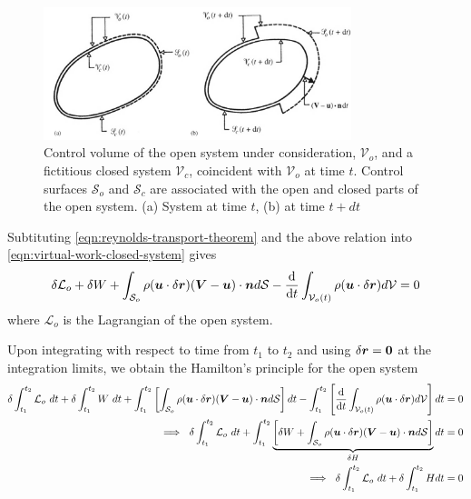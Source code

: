\documentclass[12pt]{report}
\begin{document}
\begin{figure}[h!]
	\centering
	\includegraphics[width=0.8\textwidth]{open-and-closed-portions}
	\caption{Control volume of the open system under consideration, $\mathcal{V}_o$, and a fictitious closed system $\mathcal{V}_c$, coincident with $\mathcal{V}_o$ at time $t$. Control surfaces $\mathcal{S}_o$ and $\mathcal{S}_c$ are associated with the open and closed parts of the open system. (a) System at time $t$, (b) at time $t + dt$}
	\label{fig:open-and-closed-portions}
\end{figure}

Subtituting \ref{eqn:reynolds-transport-theorem} and the above relation into \ref{eqn:virtual-work-closed-system} gives
\begin{align*}
 \delta \mathcal{L}_o + \delta W + \int_{\mathcal{S}_o} \rho (\vb*{u}\cdot \delta \vb*{r}) (\vb*{V} - \vb*{u}) \cdot \vb*{n} d\mathcal{S} -
 \dv{}{t} \int_{\mathcal{V}_o (t)} \rho (\vb*{u}\cdot \delta \vb*{r})d\mathcal{V} = 0
\end{align*}
where $\mathcal{L}_o$ is the Lagrangian of the open system.


Upon integrating with respect to time from $t_1$ to $t_2$ and using $\delta \vb*{r} = \vb*{0}$ at the integration limits, we obtain the Hamilton's principle for the open system
\begin{align}
  \delta \int_{t_1}^{t_2}\mathcal{L}_o~dt + \delta \int_{t_1}^{t_2} W~dt + \int_{t_1}^{t_2}\left[\int_{\mathcal{S}_o} \rho (\vb*{u}\cdot \delta \vb*{r}) (\vb*{V} - \vb*{u}) \cdot \vb*{n} d\mathcal{S}\right] dt - \int_{t_1}^{t_2} \left[
 \dv{}{t} \int_{\mathcal{V}_o (t)} \rho (\vb*{u}\cdot \delta \vb*{r})d\mathcal{V}\right] dt &= 0 \notag \\
 \implies~\delta \int_{t_1}^{t_2}\mathcal{L}_o~dt + \int_{t_1}^{t_2} \underbrace{\left[\delta W + \int_{\mathcal{S}_o}\rho (\vb*{u}\cdot \delta \vb*{r}) (\vb*{V} - \vb*{u}) \cdot \vb*{n} d\mathcal{S}\right]}_{\delta H} dt & = 0 \notag \\
 \implies~\delta \int_{t_1}^{t_2}\mathcal{L}_o~dt + \delta \int_{t_1}^{t_2}  H dt &= 0  \label{eqn:L-H}
\end{align}
\end{document}
